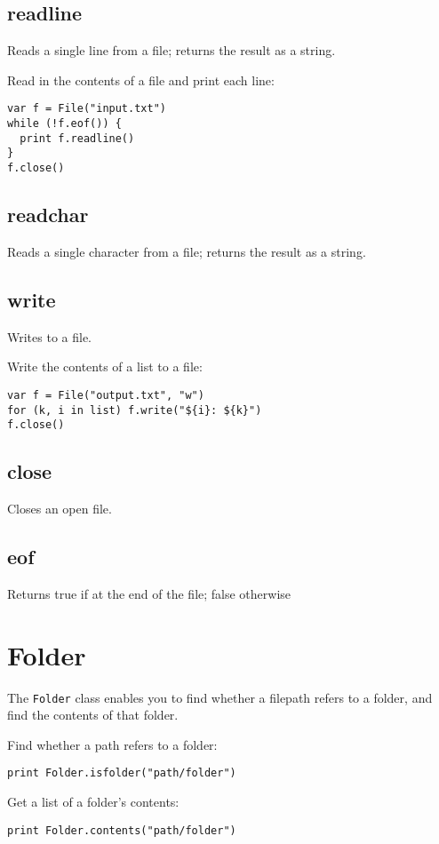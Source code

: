 \hypertarget{readline}{%
\subsection{readline}\label{readline}}

Reads a single line from a file; returns the result as a string.

Read in the contents of a file and print each line:

\begin{lstlisting}
var f = File("input.txt")
while (!f.eof()) {
  print f.readline()
}
f.close()
\end{lstlisting}

\hypertarget{readchar}{%
\subsection{readchar}\label{readchar}}

Reads a single character from a file; returns the result as a string.

\hypertarget{write}{%
\subsection{write}\label{write}}

Writes to a file.

Write the contents of a list to a file:

\begin{lstlisting}
var f = File("output.txt", "w")
for (k, i in list) f.write("${i}: ${k}")
f.close()
\end{lstlisting}

\hypertarget{close}{%
\subsection{close}\label{close}}

Closes an open file.

\hypertarget{eof}{%
\subsection{eof}\label{eof}}

Returns true if at the end of the file; false otherwise

\hypertarget{folder}{%
\section{Folder}\label{folder}}

The \texttt{Folder} class enables you to find whether a filepath refers
to a folder, and find the contents of that folder.

Find whether a path refers to a folder:

\begin{lstlisting}
print Folder.isfolder("path/folder")
\end{lstlisting}

Get a list of a folder's contents:

\begin{lstlisting}
print Folder.contents("path/folder")
\end{lstlisting}
